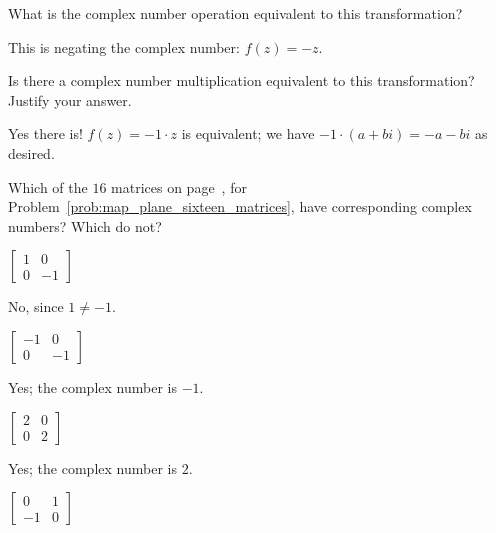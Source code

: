 \documentclass[../gatm_answers.tex]{subfiles}
\begin{document}
\begin{inner_problem}
\item What is the complex number operation equivalent to this transformation?
\end{inner_problem}

This is negating the complex number: $f(z) = -z$.

\begin{inner_problem}
\item Is there a complex number multiplication equivalent to this transformation? Justify your answer.
\end{inner_problem}

Yes there is! $f(z) = -1\cdot z$ is equivalent; we have $-1 \cdot (a+bi) = -a-bi$ as desired.

\begin{outer_problem}
\item 
\end{outer_problem}

\newcommand{\mtrxtbt}[4] {$\left[\begin{array}{cc}#1 & #2 \\ #3 & #4 \end{array}\right]$}

\begin{inner_problem}[start=1]
\item Which of the $16$ matrices on page~\pageref{prob:map_plane_sixteen_matrices}, for Problem~\ref{prob:map_plane_sixteen_matrices}, have corresponding complex numbers? Which do not?
\end{inner_problem}

\begin{iinner_problem}[start=1]
\item \mtrxtbt{1}{0}{0}{-1}
\end{iinner_problem}

No, since $1\neq -1$.

\begin{iinner_problem}
\item \mtrxtbt{-1}{0}{0}{-1}
\end{iinner_problem}

Yes; the complex number is $-1$.

\begin{iinner_problem}
\item \mtrxtbt{2}{0}{0}{2}
\end{iinner_problem}

Yes; the complex number is $2$.

\begin{iinner_problem}
\item \mtrxtbt{0}{1}{-1}{0}
\end{iinner_problem}
\end{document}
